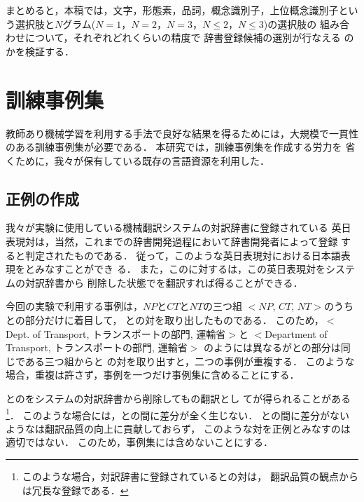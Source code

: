 まとめると，本稿では，文字，形態素，品詞，概念識別子，上位概念識別子とい
う選択肢と$N$グラム($N = 1$，$N = 2$，$N = 3$，$N \le 2$，$N \le 3$)の選択肢の
組み合わせについて，それぞれどれくらいの精度で
辞書登録候補の選別が行なえる
のかを検証する．


\section{訓練事例集}
\label{sec:traindata}

教師あり機械学習を利用する手法で良好な結果を得るためには，大規模で一貫性
のある訓練事例集が必要である．
本研究では，訓練事例集を作成する労力を
省くために，我々が保有している既存の言語資源を利用した．


\subsection{正例の作成}
\label{sec:traindata:pos}

我々が実験に使用している機械翻訳システムの対訳辞書に登録されている
英日表現対は，当然，これまでの辞書開発過程において辞書開発者によって登録
すると判定されたものである．
従って，このような英日表現対における日本語表現を{\NT}とみなすことができ
る．
また，この{\NT}に対する{\CT}は，この英日表現対をシステムの対訳辞書から
削除した状態で{\ENP}を翻訳すれば得ることができる．

今回の実験で利用する事例は，{\ENP}$NP$と{\CT}$CT$と{\NT}$NT$の三つ組
$<NP$, $CT$, $NT>$のうち{\CT}と{\NT}の部分だけに着目して，
{\CT}と{\NT}の対を取り出したものである．
このため，$<$Dept. of Transport, トランスポートの部門, 運輸省$>$と
$<$Department of Transport, トランスポートの部門, 運輸省$>$
のように{\ENP}は異なるが{\CT}と{\NT}の部分は同じである三つ組から{\CT}と
{\NT}の対を取り出すと，二つの事例が重複する．
このような場合，重複は許さず，事例を一つだけ事例集に含めることにする．

{\ENP}と{\NT}の{\EJP}をシステムの対訳辞書から削除しても{\ENP}の翻訳とし
て{\NT}が得られることがある
\footnote{このような場合，対訳辞書に登録されている{\ENP}と{\NT}の対は，
翻訳品質の観点からは冗長な登録である．}．
このような場合には，{\CT}と{\NT}の間に差分が全く生じない．
{\CT}と{\NT}の間に差分がないような{\EJP}は翻訳品質の向上に貢献しておらず，
このような対を正例とみなすのは適切ではない．
このため，事例集には含めないことにする．

